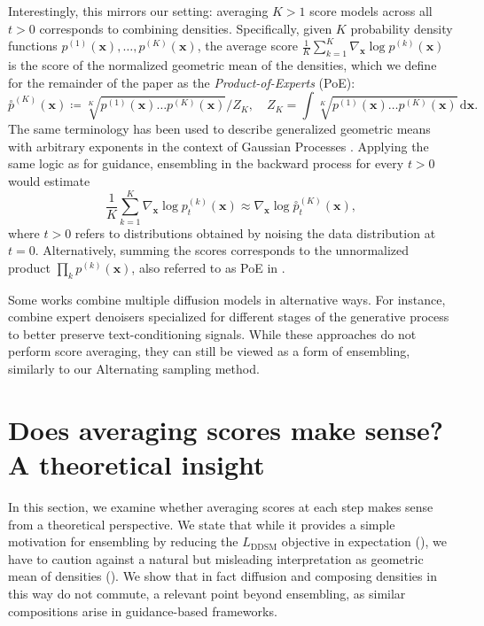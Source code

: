 \documentclass[10pt]{article} %
\newcommand{\DDSM}{\text{DDSM}}
\def\rvx{{\mathbf{x}}}
\newcommand{\geo}[1]{\overset{\circ}{#1}}
\begin{document}
Interestingly, this mirrors our setting: averaging $K > 1$ score models across all $t > 0$ corresponds to combining densities. Specifically, given $K$ probability density functions $p^{(1)}(\rvx),\dots,p^{(K)}(\rvx)$, the average score
$\frac{1}{K} \sum_{k=1}^K \nabla_\rvx \log p^{(k)}(\rvx)$
is the score of the normalized geometric mean of the densities, which we define for the remainder of the paper as the \textit{Product-of-Experts} (PoE):
\begin{equation}
\geo{p}^{(K)}(\rvx) \coloneqq 
\sqrt[K]{p^{(1)}(\rvx)\dots p^{(K)}(\rvx)} \big/ Z_K, 
\quad 
Z_K = \int \sqrt[K]{p^{(1)}(\rvx)\dots p^{(K)}(\rvx)}\, \mathrm{d}\rvx.
\end{equation}
The same terminology has been used to describe generalized geometric means with arbitrary exponents in the context of Gaussian Processes \citep{liu2018generalized,cohen2021healing}. Applying the same logic as for guidance, ensembling in the backward process for every $t>0$ would estimate \begin{equation}\label{eq: equality score PoE}
\frac{1}{K} \sum_{k=1}^K \nabla_\rvx \log p_t^{(k)}(\rvx) \approx \nabla_\rvx \log \geo{p}_t^{(K)}(\rvx),
\end{equation} where $t > 0$ refers to distributions obtained by noising the data distribution at $t = 0$. Alternatively, summing the scores corresponds to the unnormalized product $\prod_k p^{(k)}(\rvx)$, also referred to as PoE in \citet{hinton2002}.


Some works combine multiple diffusion models in alternative ways. For instance, \citet{balaji2022ediff, feng2023ernie} combine expert denoisers specialized for different stages of the generative process to better preserve text-conditioning signals. While these approaches do not perform score averaging, they can still be viewed as a form of ensembling, similarly to our Alternating sampling method.




\section{Does averaging scores make sense? A theoretical insight}\label{section: theoretical note}


In this section, we examine whether averaging scores at each step makes sense from a theoretical perspective. We state that while it provides a simple motivation for ensembling by reducing the $L_\DDSM$ objective in expectation (), we have to caution against a natural but misleading interpretation as geometric mean of densities (). We show that in fact diffusion and composing densities in this way do not commute, a relevant point beyond ensembling, as similar compositions arise in guidance-based frameworks.
\end{document}
